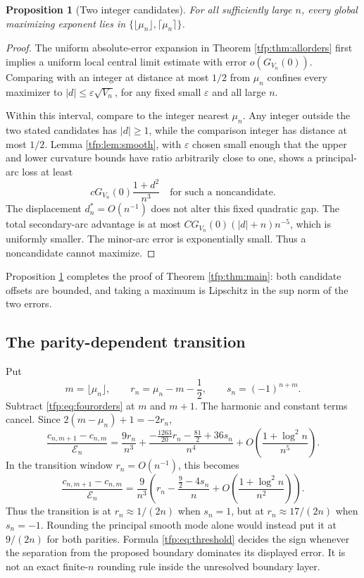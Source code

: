 \documentclass[11pt,a4paper]{article}
\numberwithin{equation}{section}
\newtheorem{proposition}[theorem]{Proposition}
\theoremstyle{definition}\newtheorem{definition}[theorem]{Definition}
\theoremstyle{remark}\newtheorem{remark}[theorem]{Remark}
\newcommand{\calE}{\mathcal E}
\begin{document}
\begin{proposition}[Two integer candidates]\label{tfp:prop:twocandidates}
For all sufficiently large $n$, every global maximizing exponent lies
in $\{\lfloor\mu_n\rfloor,\lceil\mu_n\rceil\}$.
\end{proposition}
\begin{proof}
The uniform absolute-error expansion in Theorem \ref{tfp:thm:allorders}
first implies a uniform local central limit estimate with error
$o(G_{V_n}(0))$. Comparing with an integer at distance at most $1/2$
from $\mu_n$ confines every maximizer to
$|d|\le\varepsilon\sqrt{V_n}$, for any fixed small $\varepsilon$ and
all large $n$.

Within this interval, compare to the integer nearest $\mu_n$.
Any integer outside the two stated candidates has $|d|\ge1$, while
the comparison integer has distance at most $1/2$. Lemma
\ref{tfp:lem:smooth}, with $\varepsilon$ chosen small enough that the
upper and lower curvature bounds have ratio arbitrarily close to one,
shows a principal-arc loss at least
\[
 cG_{V_n}(0)\frac{1+d^2}{n^3}
 \quad\text{for such a noncandidate.}
\]
The displacement $d_n^*=O(n^{-1})$ does not alter this fixed quadratic
gap. The total secondary-arc advantage is at most
$CG_{V_n}(0)(|d|+n)n^{-5}$, which is uniformly smaller. The minor-arc
error is exponentially small. Thus a noncandidate cannot maximize.
\end{proof}

Proposition \ref{tfp:prop:twocandidates} completes the proof of
Theorem \ref{tfp:thm:main}: both candidate offsets are bounded, and taking
a maximum is Lipschitz in the sup norm of the two errors.

\subsection{The parity-dependent transition}
Put
\begin{equation}
 m=\lfloor\mu_n\rfloor,\qquad
 r_n=\mu_n-m-\frac12,\qquad s_n=(-1)^{n+m}.
\end{equation}
Subtract \eqref{tfp:eq:fourorders} at $m$ and $m+1$. The harmonic and
constant terms cancel. Since $2(m-\mu_n)+1=-2r_n$,
\begin{equation}\label{tfp:eq:diffexact}
 \frac{c_{n,m+1}-c_{n,m}}{\calE_n}
  =\frac{9r_n}{n^3}
   +\frac{-\frac{1263}{20}r_n-\frac{81}{2}+36s_n}{n^4}
   +O\!\left(\frac{1+\log^2 n}{n^5}\right).
\end{equation}
In the transition window $r_n=O(n^{-1})$, this becomes
\begin{equation}\label{tfp:eq:threshold}
 \frac{c_{n,m+1}-c_{n,m}}{\calE_n}
 =\frac9{n^3}\left(r_n-\frac{\frac92-4s_n}{n}
                +O\!\left(\frac{1+\log^2n}{n^2}\right)\right).
\end{equation}
Thus the transition is at $r_n\approx1/(2n)$ when $s_n=1$, but at
$r_n\approx17/(2n)$ when $s_n=-1$. Rounding the principal smooth mode
alone would instead put it at $9/(2n)$ for both parities. Formula
\eqref{tfp:eq:threshold} decides the sign whenever the separation from
the proposed boundary dominates its displayed error. It is not an
exact finite-$n$ rounding rule inside the unresolved boundary layer.
\end{document}
